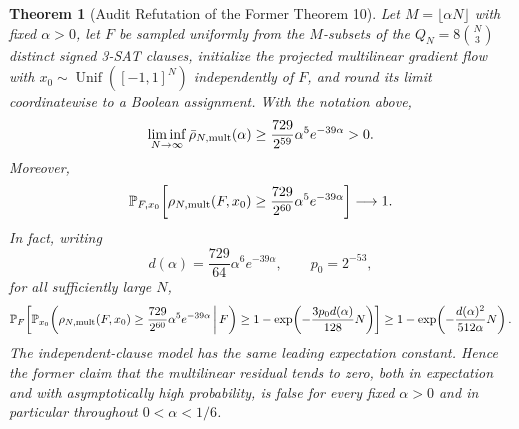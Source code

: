 \documentclass[11pt,a4paper]{article}
\newtheorem{theorem}{Theorem}[section]
\begin{document}
\begin{theorem}[Audit Refutation of the Former Theorem 10]
\label{thm:subcritical_separation}
Let $M=\lfloor\alpha N\rfloor$ with fixed $\alpha>0$, let $F$ be sampled
uniformly from the $M$-subsets of the $Q_N=8\binom N3$ distinct signed
3-SAT clauses, initialize the projected multilinear gradient flow with
$x_0\sim\operatorname{Unif}([-1,1]^N)$ independently of $F$, and round its
limit coordinatewise to a Boolean assignment. With the notation above,
\begin{equation}
\liminf_{N\to\infty}\bar\rho_{N,\rm mult}(\alpha)
\ge \frac{729}{2^{59}}\alpha^5e^{-39\alpha}>0.
\label{eq:t10_refutation}
\end{equation}
Moreover,
\begin{equation}
\mathbb P_{F,x_0}\!\left[
\rho_{N,\rm mult}(F,x_0)
\ge
\frac{729}{2^{60}}\alpha^5e^{-39\alpha}
\right]\longrightarrow1.
\label{eq:t10_refutation_whp}
\end{equation}
In fact, writing
\[
d(\alpha)=\frac{729}{64}\alpha^6e^{-39\alpha},
\qquad p_0=2^{-53},
\]
for all sufficiently large $N$,
\begin{equation}
\mathbb P_F\!\left[
\mathbb P_{x_0}\!\left(
\rho_{N,\rm mult}(F,x_0)\ge
\frac{729}{2^{60}}\alpha^5e^{-39\alpha}
\,\middle|\,F
\right)
\ge 1-\exp\!\left(-\frac{3p_0d(\alpha)}{128}N\right)
\right]
\ge
1-\exp\!\left(-\frac{d(\alpha)^2}{512\alpha}N\right).
\label{eq:t10_refutation_conditional}
\end{equation}
The independent-clause model has the same leading expectation constant.
Hence the former claim that the multilinear residual tends to zero, both
in expectation and with asymptotically high probability, is false for every
fixed $\alpha>0$ and in particular throughout $0<\alpha<1/6$.
\end{theorem}
\end{document}
